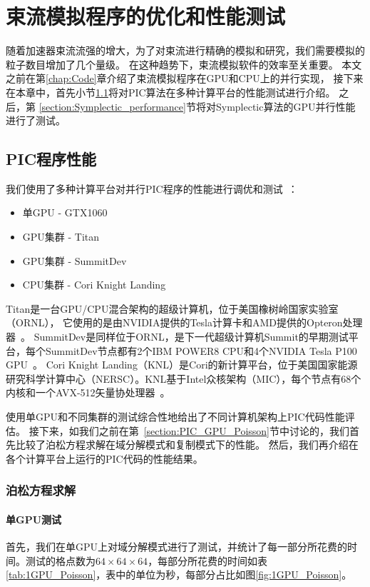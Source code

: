 \chapter{束流模拟程序的优化和性能测试} \label{chap:Performance}
随着加速器束流流强的增大，为了对束流进行精确的模拟和研究，我们需要模拟的粒子数目增加了几个量级。
在这种趋势下，束流模拟软件的效率至关重要。
本文之前在第\ref{chap:Code}章介绍了束流模拟程序在GPU和CPU上的并行实现，
接下来在本章中，首先小节\ref{section:PIC_performance}将对PIC算法在多种计算平台的性能测试进行介绍。
之后，第 \ref{section:Symplectic_performance}节将对Symplectic算法的GPU并行性能进行了测试。

\section{PIC程序性能}             \label{section:PIC_performance}
我们使用了多种计算平台对并行PIC程序的性能进行调优和测试~\cite{tiwari2015Titan,wells2016Summit,he2018Cori}：
\begin{itemize}
  \item 单GPU - GTX1060
  \item GPU集群 - Titan
  \item GPU集群 - SummitDev
  \item CPU集群 - Cori Knight Landing
\end{itemize}

Titan是一台GPU/CPU混合架构的超级计算机，位于美国橡树岭国家实验室（ORNL），
它使用的是由NVIDIA提供的Tesla计算卡和AMD提供的Opteron处理器~\cite{TitanURL}。
SummitDev是同样位于ORNL，是下一代超级计算机Summit的早期测试平台，每个SummitDev节点都有2个IBM POWER8 CPU和4个NVIDIA Tesla P100 GPU~\cite{SummitURL}。
Cori Knight Landing（KNL）是Cori的新计算平台，位于美国国家能源研究科学计算中心（NERSC）。KNL基于Intel众核架构（MIC），每个节点有68个内核和一个AVX-512矢量协处理器~\cite{KnlURL}。

使用单GPU和不同集群的测试综合性地给出了不同计算机架构上PIC代码性能评估。
接下来，如我们之前在第~\ref{section:PIC_GPU_Poisson}节中讨论的，我们首先比较了泊松方程求解在域分解模式和复制模式下的性能。
然后，我们再介绍在各个计算平台上运行的PIC代码的性能结果。

\subsection{泊松方程求解}
\label{section:PIC_performance_Poisson}

\subsubsection{单GPU测试}
首先，我们在单GPU上对域分解模式进行了测试，并统计了每一部分所花费的时间。测试的格点数为$64 \times 64 \times 64$，每部分所花费的时间如表\ref{tab:1GPU_Poisson}，表中的单位为秒，每部分占比如图\ref{fig:1GPU_Poisson}。

